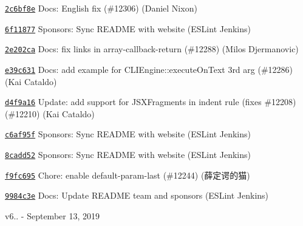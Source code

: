 \begin{DoxyItemize}
\item \href{https://github.com/eslint/eslint/commit/2c6bf8ea9c8a8f94746f980bd5bea0a8c5c4d6b7}{\texttt{ {\ttfamily 2c6bf8e}}} Docs\+: English fix (\#12306) (Daniel Nixon)
\item \href{https://github.com/eslint/eslint/commit/6f118778366613fc53036cb6a7537e1b4c6e7af8}{\texttt{ {\ttfamily 6f11877}}} Sponsors\+: Sync R\+E\+A\+D\+ME with website (E\+S\+Lint Jenkins)
\item \href{https://github.com/eslint/eslint/commit/2e202ca2228846e6226aa8dd99c614d572fb86a8}{\texttt{ {\ttfamily 2e202ca}}} Docs\+: fix links in array-\/callback-\/return (\#12288) (Milos Djermanovic)
\item \href{https://github.com/eslint/eslint/commit/e39c6318af0fd27edd5fd2aaf2b24a3e204005dd}{\texttt{ {\ttfamily e39c631}}} Docs\+: add example for C\+L\+I\+Engine\+::execute\+On\+Text 3rd arg (\#12286) (Kai Cataldo)
\item \href{https://github.com/eslint/eslint/commit/d4f9a16af7e00021e2ed63823d9c2f149bc985d6}{\texttt{ {\ttfamily d4f9a16}}} Update\+: add support for J\+S\+X\+Fragments in indent rule (fixes \#12208) (\#12210) (Kai Cataldo)
\item \href{https://github.com/eslint/eslint/commit/c6af95f5bf1ef10f08545d54fd52b98e85fdf7f7}{\texttt{ {\ttfamily c6af95f}}} Sponsors\+: Sync R\+E\+A\+D\+ME with website (E\+S\+Lint Jenkins)
\item \href{https://github.com/eslint/eslint/commit/8cadd5229b7372aed0d4785dcae15532a399bf55}{\texttt{ {\ttfamily 8cadd52}}} Sponsors\+: Sync R\+E\+A\+D\+ME with website (E\+S\+Lint Jenkins)
\item \href{https://github.com/eslint/eslint/commit/f9fc695d77c19cd5ecb3f0e97e1ea124c8543409}{\texttt{ {\ttfamily f9fc695}}} Chore\+: enable default-\/param-\/last (\#12244) (薛定谔的猫)
\item \href{https://github.com/eslint/eslint/commit/9984c3e27c92de76b8c05a58525dbcea12b10b83}{\texttt{ {\ttfamily 9984c3e}}} Docs\+: Update R\+E\+A\+D\+ME team and sponsors (E\+S\+Lint Jenkins)
\end{DoxyItemize}

v6.. -\/ September 13, 2019


